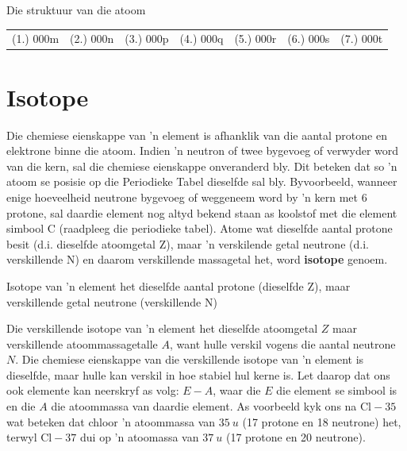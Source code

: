 \begin{exercises}{Die struktuur van die atoom}
\practiceinfo
\par 
 \par \begin{tabular}[h]{ccccccc}
 (1.) 000m  &  (2.) 000n  &  (3.) 000p  &  (4.) 000q  &  (5.) 000r  &  (6.) 000s  &  (7.) 000t  & \end{tabular}
\end{exercises}


         \section{Isotope}
    \nopagebreak

Die chemiese eienskappe van 'n element is afhanklik van die aantal protone en elektrone binne die atoom. Indien 'n neutron of twee bygevoeg of verwyder word van die kern, sal die chemiese eienskappe onveranderd bly. Dit beteken dat so 'n atoom se posisie op die Periodieke Tabel dieselfde sal bly. Byvoorbeeld, wanneer enige hoeveelheid neutrone bygevoeg of weggeneem word by  'n kern met 6 protone, sal daardie element nog altyd bekend staan as koolstof met die element simbool $\text{C}$ (raadpleeg die periodieke tabel). Atome wat dieselfde aantal protone besit (d.i. dieselfde atoomgetal Z), maar 'n verskilende getal neutrone (d.i. verskillende N) en daarom verskillende massagetal het, word \textbf{isotope} genoem.\par 

 {Isotope van 'n element het dieselfde aantal protone (dieselfde Z), maar verskillende getal neutrone (verskillende N)} 
        

Die verskillende isotope van 'n element het dieselfde atoomgetal $Z$ maar verskillende atoommassagetalle $A$, want hulle verskil vogens die aantal neutrone $N$. Die chemiese eienskappe van die verskillende isotope van 'n element is dieselfde, maar hulle kan verskil in hoe stabiel hul kerne is. Let daarop dat ons ook elemente kan neerskryf as volg: $E - A$, waar die $E$ die element se simbool is en die $A$ die atoommassa van daardie element. As voorbeeld kyk ons na $\text{Cl}-35$ wat beteken dat chloor 'n atoommassa van $35 ~u$ (17 protone en 18 neutrone) het, terwyl $\text{Cl}-37$ dui op  'n atoomassa van $37 ~u$ (17 protone en 20 neutrone).  \par 


